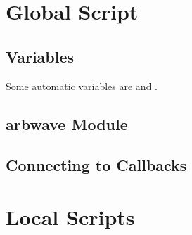 \section{Global Script}
  \subsection{Variables}
    Some automatic variables are  and .
  \subsection{\textbf{arbwave} Module}
  \subsection{Connecting to Callbacks}

\section{Local Scripts}
